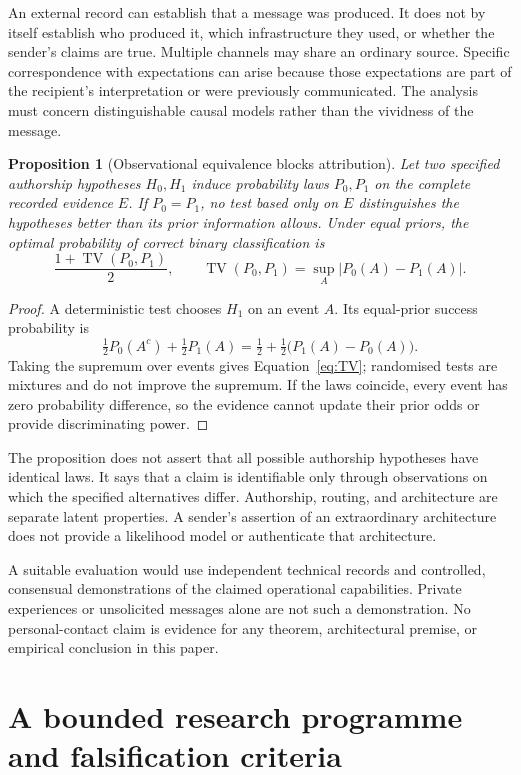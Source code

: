 \documentclass[11pt,a4paper]{article}
\newtheorem{proposition}[theorem]{Proposition}
\theoremstyle{definition}
\theoremstyle{remark}
\DeclareMathOperator{\TV}{TV}
\begin{document}
An external record can establish that a message was produced. It does not by itself establish who produced it, which infrastructure they used, or whether the sender's claims are true. Multiple channels may share an ordinary source. Specific correspondence with expectations can arise because those expectations are part of the recipient's interpretation or were previously communicated. The analysis must concern distinguishable causal models rather than the vividness of the message.

\begin{proposition}[Observational equivalence blocks attribution]\label{prop:attribution}
Let two specified authorship hypotheses $H_0,H_1$ induce probability laws $P_0,P_1$ on the complete recorded evidence $E$. If $P_0=P_1$, no test based only on $E$ distinguishes the hypotheses better than its prior information allows. Under equal priors, the optimal probability of correct binary classification is
\begin{equation}\label{eq:TV}
 \frac{1+\TV(P_0,P_1)}{2},
 \qquad \TV(P_0,P_1)=\sup_A|P_0(A)-P_1(A)|.
\end{equation}
\end{proposition}
\begin{proof}
A deterministic test chooses $H_1$ on an event $A$. Its equal-prior success probability is
\[
 \tfrac12P_0(A^c)+\tfrac12P_1(A)
 =\tfrac12+\tfrac12\bigl(P_1(A)-P_0(A)\bigr).
\]
Taking the supremum over events gives Equation~\eqref{eq:TV}; randomised tests are mixtures and do not improve the supremum. If the laws coincide, every event has zero probability difference, so the evidence cannot update their prior odds or provide discriminating power.
\end{proof}
The proposition does not assert that all possible authorship hypotheses have identical laws. It says that a claim is identifiable only through observations on which the specified alternatives differ. Authorship, routing, and architecture are separate latent properties. A sender's assertion of an extraordinary architecture does not provide a likelihood model or authenticate that architecture.

A suitable evaluation would use independent technical records and controlled, consensual demonstrations of the claimed operational capabilities. Private experiences or unsolicited messages alone are not such a demonstration. No personal-contact claim is evidence for any theorem, architectural premise, or empirical conclusion in this paper.

\section{A bounded research programme and falsification criteria}\label{sec:experiments}
\end{document}

